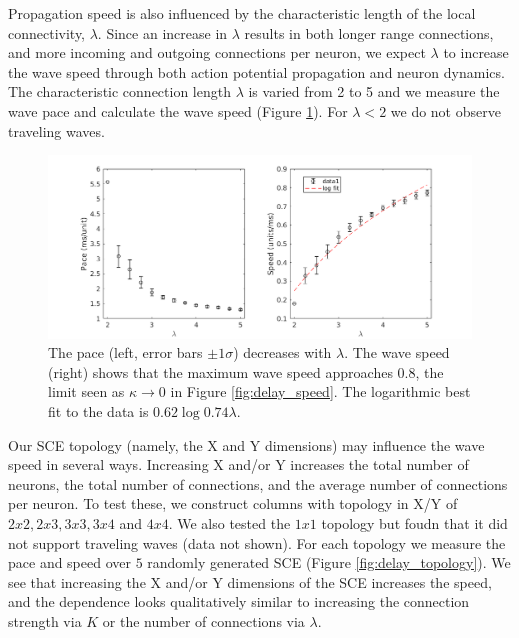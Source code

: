 \documentclass[12pt]{article}
\begin{document}
Propagation speed is also influenced by the characteristic length of the local connectivity, $\lambda$.
Since an increase in $\lambda$ results in both longer range connections, and more incoming and outgoing connections per neuron, we expect $\lambda$ to increase the wave speed through both action potential propagation and neuron dynamics.
The characteristic connection length $\lambda$ is varied from 2 to 5 and we measure the wave pace and calculate the wave speed (Figure \ref{fig:delay_lambda}).
For \color{red}$\lambda<2$ \color{black} we do not observe traveling waves.
\begin{figure}[!htb]
 \caption{ The pace (left, error bars $\pm 1 \sigma$) decreases with $\lambda$. 
           The wave speed (right) shows that the maximum wave speed approaches $0.8$, the limit seen as $\kappa \rightarrow 0$ in Figure \ref{fig:delay_speed}. 
           \color{red}The logarithmic best fit to the data is $0.62\log{0.74\lambda}$\color{black}.}
 \label{fig:delay_lambda}
 \centering
   \includegraphics[width=\textwidth]{fig/WaveSpeed_Lambda}
\end{figure}

\FloatBarrier

\color{red}
Our SCE topology (namely, the X and Y dimensions) may influence the wave speed in several ways.
Increasing X and/or Y increases the total number of neurons, the total number of connections, and the average number of connections per neuron.
To test these, we construct columns with topology in X/Y of $2x2, 2x3, 3x3, 3x4$ and $4x4$.
We also tested the $1x1$ topology but foudn that it did not support traveling waves (data not shown).
For each topology we measure the pace and speed over $5$ randomly generated SCE (Figure \ref{fig:delay_topology}).
We see that increasing the X and/or Y dimensions of the SCE increases the speed, and the dependence looks qualitatively similar to increasing the connection strength via $K$ or the number of connections via $\lambda$.
\end{document}
